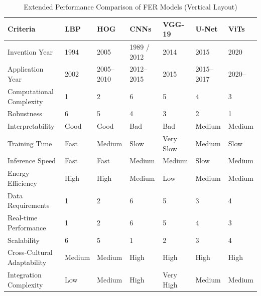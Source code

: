 \documentclass[lettersize,journal]{IEEEtran}
\begin{document}
\begin{table}[H]
\caption{Extended Performance Comparison of FER Models (Vertical Layout)}
\label{tab:model_comparison_extended}
\centering
\footnotesize
\begin{tabular}{|p{1.6cm}|p{0.7cm}|p{0.7cm}|p{0.7cm}|p{0.7cm}|p{0.7cm}|p{0.7cm}|}
\hline
\textbf{Criteria}              & \textbf{LBP} & \textbf{HOG} & \textbf{CNNs} & \textbf{VGG-19} & \textbf{U-Net} & \textbf{ViTs} \\
\hline
Invention Year        & 1994         & 2005         & 1989 / 2012  & 2014            & 2015           & 2020          \\
\hline
Application Year      & 2002         & 2005--2010   & 2012--2015   & 2015            & 2015--2017     & 2020-- \\
\hline
Computational Complexity & 1           & 2            & 6            & 5               & 4              & 3             \\
\hline
Robustness            & 6           & 5            & 4            & 3               & 2              & 1             \\
\hline
Interpretability      & Good        & Good         & Bad          & Bad             & Medium         & Medium        \\
\hline
Training Time         & Fast        & Medium       & Slow         & Very Slow       & Medium         & Slow          \\
\hline
Inference Speed       & Fast        & Fast         & Medium       & Medium          & Slow           & Medium        \\
\hline
Energy Efficiency     & High        & High         & Medium       & Low             & Medium         & Medium        \\
\hline
Data Requirements     & 1           & 2            & 6            & 5               & 3              & 4             \\
\hline
Real-time Performance & 1           & 2            & 6            & 5               & 4              & 3             \\
\hline
Scalability           & 6           & 5            & 1            & 2               & 3              & 4             \\
\hline
Cross-Cultural Adaptability & Medium     & Medium       & High         & High            & High           & High          \\
\hline
Integration Complexity & Low         & Medium       & High         & Very High       & Medium         & Medium        \\
\hline
\end{tabular}


\end{table}
\end{document}
